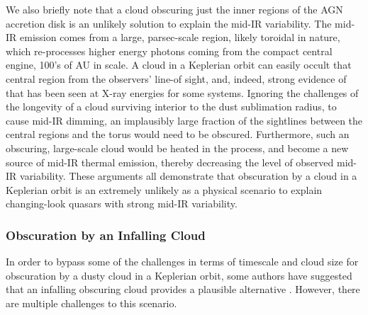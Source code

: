 \documentclass[iop]{emulateapj}
\def\eg{{e.g.}}
\begin{document}
We also briefly note that a cloud obscuring just the inner regions
of the AGN accretion disk is an unlikely solution to explain the
mid-IR variability.  The mid-IR emission comes from a large,
parsec-scale region, likely toroidal in nature, which re-processes
higher energy photons coming from the compact central engine, 100's
of AU in scale.  A cloud in a Keplerian orbit can easily occult
that central region from the observers' line-of sight, and, indeed,
strong evidence of that has been seen at X-ray energies for some
systems.  Ignoring the challenges of the longevity of a cloud
surviving interior to the dust sublimation radius, to cause mid-IR
dimming, an implausibly large fraction of the sightlines between
the central regions and the torus would need to be obscured.
Furthermore, such an obscuring, large-scale cloud would be heated
in the process, and become a new source of mid-IR thermal emission,
thereby decreasing the level of observed mid-IR variability.  These
arguments all demonstrate that obscuration by a cloud in a Keplerian
orbit is an extremely unlikely as a physical scenario to explain
changing-look quasars with strong mid-IR variability.


\subsubsection{Obscuration by an Infalling Cloud}

In order to bypass some of the challenges in terms of timescale and
cloud size for obscuration by a dusty cloud in a Keplerian orbit,
some authors have suggested that an infalling obscuring cloud
provides a plausible alternative \citep[\eg,][]{Guo:16}.  However,
there are multiple challenges to this scenario.
\end{document}
